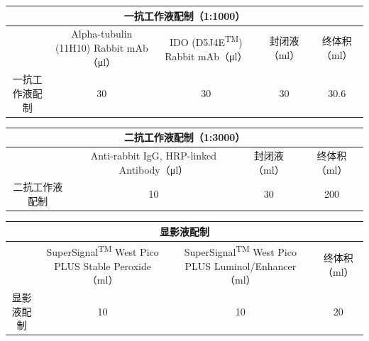 \documentclass[UTF8,10pt,a4paper,fontset=fandol]{ctexart}
\newcommand{\fieldvalue}[1]{#1}
\newcommand{\handwritten}[1]{#1}
\begin{document}
\vspace{2mm}

\begin{tabular}{|c|c|c|c|c|}
\hline
\multicolumn{5}{|c|}{一抗工作液配制（1:1000）} \\
\hline
 & Alpha-tubulin (11H10) Rabbit mAb（μl）
 & IDO (D5J4E\textsuperscript{TM}) Rabbit mAb（μl）
 & 封闭液（ml） & 终体积（ml） \\
\hline
一抗工作液配制 &
\fieldvalue{\handwritten{30}} &
\fieldvalue{\handwritten{30}} &
\fieldvalue{\handwritten{30}} &
\fieldvalue{\handwritten{30.6}} \\
\hline
\end{tabular}

\vspace{2mm}

\begin{tabular}{|c|c|c|c|}
\hline
\multicolumn{4}{|c|}{二抗工作液配制（1:3000）} \\
\hline
 & Anti-rabbit IgG, HRP-linked Antibody（μl）
 & 封闭液（ml） & 终体积（ml） \\
\hline
二抗工作液配制 &
\fieldvalue{\handwritten{10}} &
\fieldvalue{\handwritten{30}} &
\fieldvalue{\handwritten{200}} \\
\hline
\end{tabular}

\vspace{2mm}

\begin{tabular}{|c|c|c|c|}
\hline
\multicolumn{4}{|c|}{显影液配制} \\
\hline
 & SuperSignal\textsuperscript{TM} West Pico PLUS Stable Peroxide（ml）
 & SuperSignal\textsuperscript{TM} West Pico PLUS Luminol/Enhancer（ml）
 & 终体积（ml） \\
\hline
显影液配制 &
\fieldvalue{\handwritten{10}} &
\fieldvalue{\handwritten{10}} &
\fieldvalue{\handwritten{20}} \\
\hline
\end{tabular}
\end{document}
